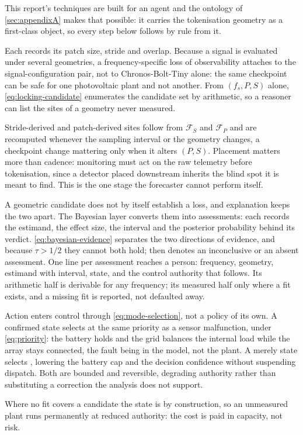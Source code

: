 This report's techniques are built for an agent and the ontology of \autoref{sec:appendixA} makes that possible: it carries the tokenisation geometry as a first-class object, so every step below follows by rule from it.

Each  records its patch size, stride and overlap. Because a signal is evaluated under several geometries, a frequency-specific loss of observability attaches to the signal-configuration pair, not to Chronos-Bolt-Tiny alone: the same checkpoint can be safe for one photovoltaic plant and not another. From $(f_s,P,S)$ alone, \autoref{eq:locking-candidate} enumerates the candidate set by arithmetic, so a reasoner can list the sites of a geometry never measured.

Stride-derived and patch-derived sites follow from $\mathcal{F}_{S}$ and $\mathcal{F}_{P}$ and are recomputed whenever the sampling interval or the geometry changes, a checkpoint change mattering only when it alters $(P,S)$. Placement matters more than cadence: monitoring must act on the raw telemetry before tokenisation, since a detector placed downstream inherits the blind spot it is meant to find. This is the one stage the forecaster cannot perform itself.

A geometric candidate does not by itself establish a loss, and explanation keeps the two apart. The Bayesian layer converts them into assessments: each  records the estimand, the effect size, the interval and the posterior probability behind its verdict. \autoref{eq:bayesian-evidence} separates the two directions of evidence, and because $\tau>1/2$ they cannot both hold;  then denotes an inconclusive or an absent assessment. One line per assessment reaches a person: frequency, geometry, estimand with interval, state, and the control authority that follows. Its arithmetic half is derivable for any frequency; its measured half only where a fit exists, and a missing fit is reported, not defaulted away.

Action enters control through \autoref{eq:mode-selection}, not a policy of its own. A confirmed  state selects  at the same priority as a sensor malfunction, under \autoref{eq:priority}: the battery holds and the grid balances the internal load while the array stays connected, the fault being in the model, not the plant. A merely  state selects , lowering the battery cap and the decision confidence without suspending dispatch. Both are bounded and reversible, degrading authority rather than substituting a correction the analysis does not support.

Where no fit covers a candidate the state is  by construction, so an unmeasured plant runs permanently at reduced authority: the cost is paid in capacity, not risk.
